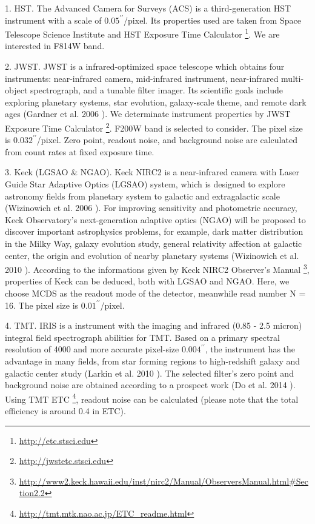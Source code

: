 \documentclass[a4paper,11pt]{article}
\begin{document}
    1. HST. The Advanced Camera for Surveys (ACS) is a third-generation HST instrument with a scale of $0.05^{\prime\prime}$/pixel. Its properties used are taken from Space Telescope Science Institute and HST Exposure Time Calculator \footnote{\url{http://etc.stsci.edu}}. We are interested in F814W band.
    
    2. JWST. JWST is a infrared-optimized space telescope which obtains four instruments: near-infrared camera, mid-infrared instrument, near-infrared multi-object spectrograph, and a tunable filter imager. Its scientific goals include exploring planetary systems, star evolution, galaxy-scale theme, and remote dark ages (Gardner et al. 2006 \cite{2006SSRv..123..485G}). We determinate instrument properties by JWST Exposure Time Calculator \footnote{\url{http://jwstetc.stsci.edu}}. F200W band is selected to consider. The pixel size is $0.032^{\prime\prime}$/pixel. Zero point, readout noise, and background noise are calculated from count rates at fixed exposure time.
    
	    3. Keck (LGSAO \& NGAO). Keck NIRC2 is a near-infrared camera with Laser Guide Star Adaptive Optics (LGSAO) system, which is designed to explore astronomy fields from planetary system to galactic and extragalactic scale (Wizinowich et al. 2006 \cite{2006PASP..118..297W}). For improving sensitivity and photometric accuracy, Keck Observatory's next-generation adaptive optics (NGAO) will be proposed to discover important astrophysics problems, for example, dark matter distribution in the Milky Way, galaxy evolution study, general relativity affection at galactic center, the origin and evolution of nearby planetary systems (Wizinowich et al. 2010 \cite{2010SPIE.7736E..0KW}). According to the informations given by Keck NIRC2 Observer's Manual \footnote{\url{http://www2.keck.hawaii.edu/inst/nirc2/Manual/ObserversManual.html#Section2.2}}, properties of Keck can be deduced, both with LGSAO and NGAO. Here, we choose MCDS as the readout mode of the detector, meanwhile read number N = 16. The pixel size is $0.01^{\prime\prime}$/pixel.
    
    4. TMT. IRIS is a instrument with the imaging and infrared (0.85 - 2.5 micron) integral field spectrograph abilities for TMT. Based on a primary spectral resolution of 4000 and more accurate pixel-size $0.004^{\prime\prime}$, the instrument has the advantage in many fields, from star forming regions to high-redshift galaxy and galactic center study (Larkin et al. 2010 \cite{2010SPIE.7735E..29L}). The selected filter's zero point and background noise are obtained according to a prospect work (Do et al. 2014 \cite{2014AJ....147...93D}). Using TMT ETC \footnote{\url{http://tmt.mtk.nao.ac.jp/ETC_readme.html}}, readout noise can be calculated (please note that the total efficiency is around 0.4 in ETC). 
    
\end{document}
